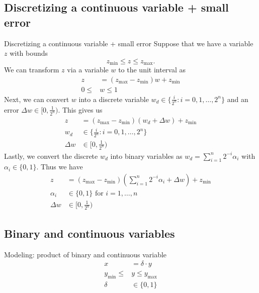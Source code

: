 \subsection{Discretizing a continuous variable + small error}
\begin{general}{Discretizing a continuous variable + small error}{}
Suppose that we have a variable $z$ with bounds 
\begin{equation}
z_{\min} \leq z \leq z_{\max}.
\end{equation}
We can transform $z$ via a variable $w$ to the unit interval as 
\begin{equation}
\begin{split}
z &= (z_{\max} - z_{\min}) w + z_{\min}\\
0 \leq &w \leq 1
\end{split}
\end{equation}
Next, we can convert $w$ into a discrete variable $w_d\in \{ \tfrac{i}{2^n} : i=0,1,\dots, 2^n\}$ and an error $\Delta w \in [0, \tfrac{1}{2^n})$.  This gives us 
\begin{equation}
\begin{split}
z &= (z_{\max} - z_{\min}) (w_d + \Delta w) + z_{\min}\\
w_d&\in \{ \tfrac{i}{2^n} : i=0,1,\dots, 2^n\}\\
\Delta w &\in  [0,\tfrac{1}{2^n})
\end{split}
\end{equation}
Lastly, we convert the discrete $w_d$ into binary variables as $w_d = \sum_{i=1}^n 2^{-i} \alpha_i$ with $\alpha_i \in \{0,1\}$.  Thus we have 
\begin{equation}
\begin{split}
z &= (z_{\max} - z_{\min}) \left(\sum_{i=1}^n 2^{-i} \alpha_i + \Delta w\right) + z_{\min}\\
\alpha_i&\in \{0,1\}  \text{ for } i=1, \dots, n\\
\Delta w& \in [0,\tfrac{1}{2^n})
\end{split}
\end{equation}
\end{general}

\subsection{Binary and continuous variables}
\begin{general}{Modeling: product of binary and continuous variable}{}
\begin{equation}
\begin{split}
x &= \delta \cdot y\\
y_{\min} \leq &y \leq y_{\max}\\
\delta &\in \{0,1\}
\end{split}
\end{equation}
\end{general}

